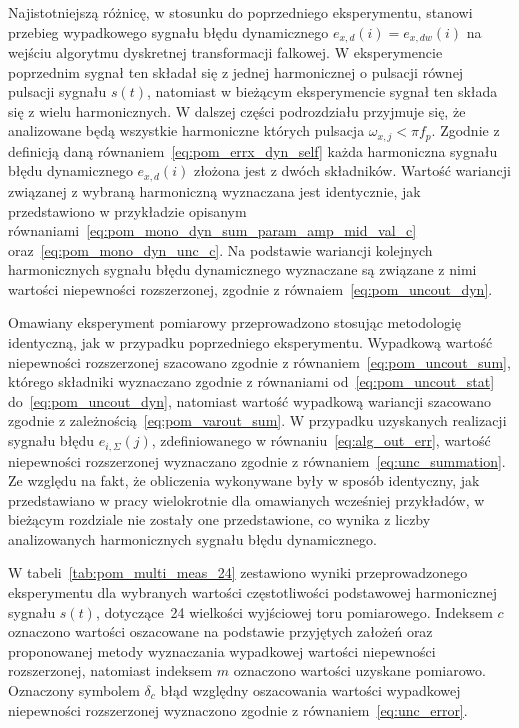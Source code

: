 Najistotniejszą różnicę, w stosunku do poprzedniego eksperymentu, stanowi przebieg wypadkowego sygnału błędu dynamicznego $e_{x,d}(i) = e_{x,dw}(i)$ na wejściu algorytmu dyskretnej transformacji falkowej. W eksperymencie poprzednim sygnał ten składał się z jednej harmonicznej o pulsacji równej pulsacji sygnału $s(t)$, natomiast w bieżącym eksperymencie sygnał ten składa się z wielu harmonicznych. W dalszej części podrozdziału przyjmuje się, że analizowane będą wszystkie harmoniczne których pulsacja $\omega_{x,j} < \pi f_{p}$. Zgodnie z definicją daną równaniem~\eqref{eq:pom_errx_dyn_self} każda harmoniczna sygnału błędu dynamicznego $e_{x,d}(i)$ złożona jest z dwóch składników. Wartość wariancji związanej z wybraną harmoniczną wyznaczana jest identycznie, jak przedstawiono w przykładzie opisanym równaniami~\eqref{eq:pom_mono_dyn_sum_param_amp_mid_val_c} oraz~\eqref{eq:pom_mono_dyn_unc_c}. Na podstawie wariancji kolejnych harmonicznych sygnału błędu dynamicznego wyznaczane są związane z nimi wartości niepewności rozszerzonej, zgodnie z równaiem~\eqref{eq:pom_uncout_dyn}.

Omawiany eksperyment pomiarowy przeprowadzono stosując metodologię identyczną, jak w przypadku poprzedniego eksperymentu. Wypadkową wartość niepewności rozszerzonej szacowano zgodnie z równaniem~\eqref{eq:pom_uncout_sum}, którego składniki wyznaczano zgodnie z równaniami od~\eqref{eq:pom_uncout_stat} do~\eqref{eq:pom_uncout_dyn}, natomiast wartość wypadkową wariancji szacowano zgodnie z zależnością~\eqref{eq:pom_varout_sum}. W przypadku uzyskanych realizacji sygnału błędu $e_{i,\Sigma}(j)$, zdefiniowanego w równaniu~\eqref{eq:alg_out_err}, wartość niepewności rozszerzonej wyznaczano zgodnie z równaniem~\eqref{eq:unc_summation}. Ze względu na fakt, że obliczenia wykonywane były w sposób identyczny, jak przedstawiano w pracy wielokrotnie dla omawianych wcześniej przykładów, w bieżącym rozdziale nie zostały one przedstawione, co wynika z liczby analizowanych harmonicznych sygnału błędu dynamicznego.

W tabeli~\ref{tab:pom_multi_meas_24} zestawiono wyniki przeprowadzonego eksperymentu dla wybranych wartości częstotliwości podstawowej harmonicznej sygnału $s(t)$, dotyczące~\qty{24}{\numTej} wielkości wyjściowej toru pomiarowego. Indeksem $c$ oznaczono wartości oszacowane na podstawie przyjętych założeń oraz proponowanej metody wyznaczania wypadkowej wartości niepewności rozszerzonej, natomiast indeksem $m$ oznaczono wartości uzyskane pomiarowo. Oznaczony symbolem $\delta_{c}$ błąd względny oszacowania wartości wypadkowej niepewności rozszerzonej wyznaczono zgodnie z równaniem~\eqref{eq:unc_error}.

